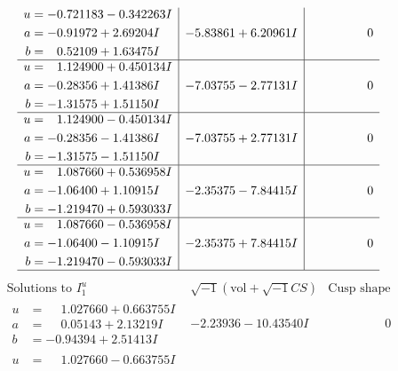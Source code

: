 \documentclass[1p]{elsarticle_modified}
\theoremstyle{definition}
\newcommand{\I}{\sqrt{-1}}
\begin{document}
$$\begin{array}{c|c|c}
\begin{aligned}
u &= -0.721183 - 0.342263 I \\
a &= -0.91972 + 2.69204 I \\
b &= \phantom{-}0.52109 + 1.63475 I\end{aligned}
 & -5.83861 + 6.20961 I & \phantom{-0.000000 } 0 \\ \hline\begin{aligned}
u &= \phantom{-}1.124900 + 0.450134 I \\
a &= -0.28356 + 1.41386 I \\
b &= -1.31575 + 1.51150 I\end{aligned}
 & -7.03755 - 2.77131 I & \phantom{-0.000000 } 0 \\ \hline\begin{aligned}
u &= \phantom{-}1.124900 - 0.450134 I \\
a &= -0.28356 - 1.41386 I \\
b &= -1.31575 - 1.51150 I\end{aligned}
 & -7.03755 + 2.77131 I & \phantom{-0.000000 } 0 \\ \hline\begin{aligned}
u &= \phantom{-}1.087660 + 0.536958 I \\
a &= -1.06400 + 1.10915 I \\
b &= -1.219470 + 0.593033 I\end{aligned}
 & -2.35375 - 7.84415 I & \phantom{-0.000000 } 0 \\ \hline\begin{aligned}
u &= \phantom{-}1.087660 - 0.536958 I \\
a &= -1.06400 - 1.10915 I \\
b &= -1.219470 - 0.593033 I\end{aligned}
 & -2.35375 + 7.84415 I & \phantom{-0.000000 } 0\\
 \hline 
 \end{array}$$\newpage$$\begin{array}{c|c|c}  
\text{Solutions to }I^u_{1}& \I (\text{vol} + \sqrt{-1}CS) & \text{Cusp shape}\\
 \hline 
\begin{aligned}
u &= \phantom{-}1.027660 + 0.663755 I \\
a &= \phantom{-}0.05143 + 2.13219 I \\
b &= -0.94394 + 2.51413 I\end{aligned}
 & -2.23936 - 10.43540 I & \phantom{-0.000000 } 0 \\ \hline\begin{aligned}
u &= \phantom{-}1.027660 - 0.663755 I \\

\end{aligned}
\end{array}$$
\end{document}
